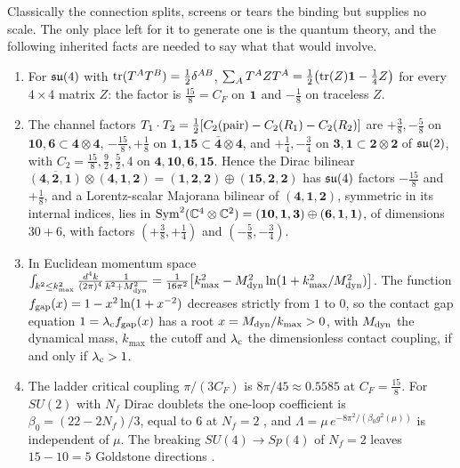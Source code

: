 Classically the connection splits, screens or tears the binding but supplies no scale. The only place left for it to generate one is the
quantum theory, and the following inherited facts are needed to say what that would involve.

\begin{proposition}
\label{bf:qym}
\begin{enumerate}[label=(\roman*),leftmargin=2.2em]
\item For $\mathfrak{su}(4)$ with $\operatorname{tr}(T^AT^B)=\tfrac12\delta^{AB}$, $\sum_AT^AZT^A=\tfrac12\bigl(\operatorname{tr}(Z)\mathbf 1-\tfrac14Z\bigr)$ for every $4\times4$ matrix $Z$: the factor is
$\tfrac{15}8=C_F$ on $\mathbf 1$ and $-\tfrac18$ on traceless $Z$.
\item The channel factors $T_1\cdot T_2=\tfrac12[C_2(\text{pair})-C_2(R_1)-C_2(R_2)]$ are $+\tfrac38,-\tfrac58$ on $\mathbf{10},\mathbf6\subset\mathbf4\otimes\mathbf4$,
$-\tfrac{15}8,+\tfrac18$ on $\mathbf1,\mathbf{15}\subset\bar{\mathbf4}\otimes\mathbf4$, and $+\tfrac14,-\tfrac34$ on $\mathbf3,\mathbf1\subset\mathbf2\otimes\mathbf2$ of
$\mathfrak{su}(2)$, with $C_2=\tfrac{15}8,\tfrac92,\tfrac52,4$ on $\mathbf4,\mathbf{10},\mathbf6,\mathbf{15}$. Hence the Dirac bilinear
$\overline{(\mathbf4,\mathbf2,\mathbf1)}\otimes(\mathbf4,\mathbf1,\mathbf2)=(\mathbf1,\mathbf2,\mathbf2)\oplus(\mathbf{15},\mathbf2,\mathbf2)$ has $\mathfrak{su}(4)$ factors
$-\tfrac{15}8$ and $+\tfrac18$, and a Lorentz-scalar Majorana bilinear of $(\mathbf4,\mathbf1,\mathbf2)$, symmetric in its internal indices, lies in
$\mathrm{Sym}^2(\mathbb{C}^4\otimes\mathbb{C}^2)=(\mathbf{10},\mathbf1,\mathbf3)\oplus(\mathbf6,\mathbf1,\mathbf1)$, of dimensions $30+6$, with factors
$(+\tfrac38,+\tfrac14)$ and $(-\tfrac58,-\tfrac34)$.
\item In Euclidean momentum space
$\int_{k^2\le k_{\max}^2}\frac{d^4k}{(2\pi)^4}\frac1{k^2+M_{\rm dyn}^2}=\frac1{16\pi^2}\bigl[k_{\max}^2-M_{\rm dyn}^2\ln(1+k_{\max}^2/M_{\rm dyn}^2)\bigr]$. The function
$f_{\rm gap}(x)=1-x^2\ln(1+x^{-2})$ decreases strictly from $1$ to $0$, so the contact gap equation $1=\lambda_{\rm c}f_{\rm gap}(x)$ has a root
$x=M_{\rm dyn}/k_{\max}>0$, with $M_{\rm dyn}$ the dynamical mass, $k_{\max}$ the cutoff and $\lambda_{\rm c}$ the dimensionless contact coupling, if and only if $\lambda_{\rm c}>1$.
\item The ladder critical coupling $\pi/(3C_F)$ \cite{FukudaKugo76,Miransky93} is $8\pi/45\approx0.5585$ at $C_F=\tfrac{15}8$. For $SU(2)$ with $N_f$
Dirac doublets the one-loop coefficient is $\beta_0=(22-2N_f)/3$, equal to $6$ at $N_f=2$ \cite{GrossWilczek73,Politzer73}, and
$\Lambda=\mu\,e^{-8\pi^2/(\beta_0g^2(\mu))}$ is independent of $\mu$. The breaking $SU(4)\to Sp(4)$ of $N_f=2$ leaves $15-10=5$ Goldstone
directions \cite{Peskin80}.
\end{enumerate}
\end{proposition}

